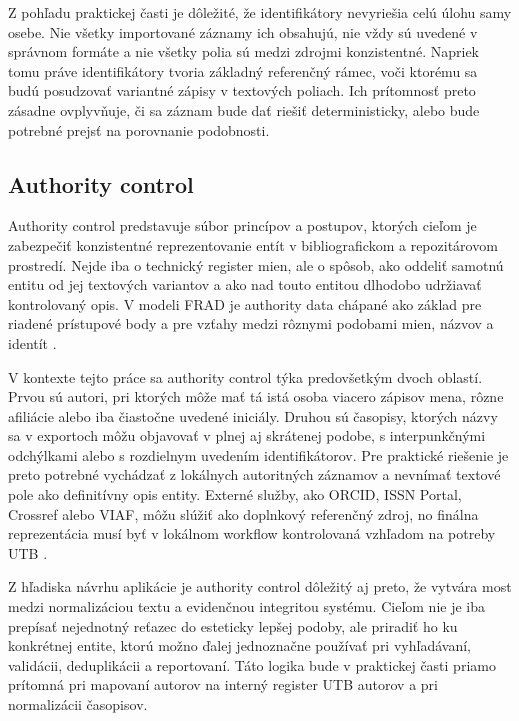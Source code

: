 Z pohľadu praktickej časti je dôležité, že identifikátory nevyriešia celú úlohu samy osebe. Nie všetky importované záznamy ich obsahujú, nie vždy sú uvedené v správnom formáte a nie všetky polia sú medzi zdrojmi konzistentné. Napriek tomu práve identifikátory tvoria základný referenčný rámec, voči ktorému sa budú posudzovať variantné zápisy v textových poliach. Ich prítomnosť preto zásadne ovplyvňuje, či sa záznam bude dať riešiť deterministicky, alebo bude potrebné prejsť na porovnanie podobnosti.

\subsection{Authority control}

Authority control predstavuje súbor princípov a postupov, ktorých cieľom je zabezpečiť konzistentné reprezentovanie entít v bibliografickom a repozitárovom prostredí. Nejde iba o technický register mien, ale o spôsob, ako oddeliť samotnú entitu od jej textových variantov a ako nad touto entitou dlhodobo udržiavať kontrolovaný opis. V modeli FRAD je authority data chápané ako základ pre riadené prístupové body a pre vzťahy medzi rôznymi podobami mien, názvov a identít \cite{FRAD2013}.

V kontexte tejto práce sa authority control týka predovšetkým dvoch oblastí. Prvou sú autori, pri ktorých môže mať tá istá osoba viacero zápisov mena, rôzne afiliácie alebo iba čiastočne uvedené iniciály. Druhou sú časopisy, ktorých názvy sa v exportoch môžu objavovať v plnej aj skrátenej podobe, s interpunkčnými odchýlkami alebo s rozdielnym uvedením identifikátorov. Pre praktické riešenie je preto potrebné vychádzať z lokálnych autoritných záznamov a nevnímať textové pole ako definitívny opis entity. Externé služby, ako ORCID, ISSN Portal, Crossref alebo VIAF, môžu slúžiť ako doplnkový referenčný zdroj, no finálna reprezentácia musí byť v lokálnom workflow kontrolovaná vzhľadom na potreby UTB \cite{ORCIDWhatIs,ISSNWhatIs,VIAF,CrossrefRESTAPI}.

Z hľadiska návrhu aplikácie je authority control dôležitý aj preto, že vytvára most medzi normalizáciou textu a evidenčnou integritou systému. Cieľom nie je iba prepísať nejednotný reťazec do esteticky lepšej podoby, ale priradiť ho ku konkrétnej entite, ktorú možno ďalej jednoznačne používať pri vyhľadávaní, validácii, deduplikácii a reportovaní. Táto logika bude v praktickej časti priamo prítomná pri mapovaní autorov na interný register UTB autorov a pri normalizácii časopisov.

